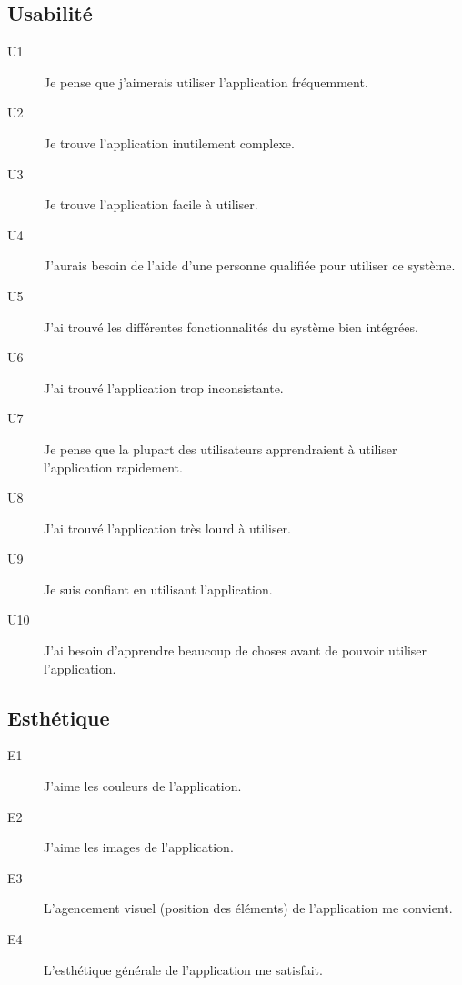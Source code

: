 \documentclass[a4paper, 11pt]{article}
\begin{document}
        \subsection*{Usabilité}
            \begin{description}
                \item[U1] Je pense que j'aimerais utiliser l'application fréquemment.
                \item[U2] Je trouve l'application inutilement complexe.
                \item[U3] Je trouve l'application facile à utiliser.
                \item[U4] J'aurais besoin de l'aide d'une personne qualifiée pour utiliser ce système.
                \item[U5] J'ai trouvé les différentes fonctionnalités du système bien intégrées.
                \item[U6] J'ai trouvé l'application trop inconsistante.
                \item[U7] Je pense que la plupart des utilisateurs apprendraient à utiliser l'application rapidement.
                \item[U8] J'ai trouvé l'application très lourd à utiliser.
                \item[U9] Je suis confiant en utilisant l'application.
                \item[U10] J'ai besoin d'apprendre beaucoup de choses avant de pouvoir utiliser l'application.
            \end{description}

        \subsection*{Esthétique}
            \begin{description}
                \item[E1] J'aime les couleurs de l'application.
                \item[E2] J'aime les images de l'application.
                \item[E3] L'agencement visuel (position des éléments) de l'application me convient.
                \item[E4] L'esthétique générale de l'application me satisfait.
            \end{description}
\end{document}
